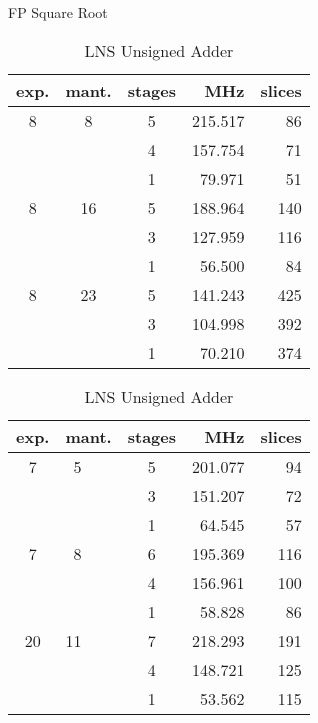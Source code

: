 \documentclass{llncs}
\begin{document}
\begin{table}
  \begin{center}
    \begin{minipage}{.45\linewidth}
      \caption{FP Square Root}
      \begin{center}
	\begin{tabular}{cccrr}
	  \hline
	  exp. & mant. & stages & MHz & slices\\
	  \hline
	  8   &  8 & 5 & 215.517 & 86 \\
	      &    & 4 & 157.754 & 71 \\
	      &    & 1 &  79.971 & 51 \\
	  \hline
	  8   & 16 & 5 & 188.964 & 140 \\
	      &    & 3 & 127.959 & 116 \\
	      &    & 1 &  56.500 &  84 \\
	  \hline
	  8   & 23 & 5 & 141.243 & 425 \\
	      &    & 3 & 104.998 & 392 \\
	      &    & 1 &  70.210 & 374 \\
	  \hline
	\end{tabular}
      \end{center}
      \label{tabpg_float_sqrt}
    \end{minipage}
    \hspace{2.0pc}
    \begin{minipage}{.45\linewidth}
      \caption{LNS Unsigned Adder}
      \begin{center}
	\begin{tabular}{clcrr}
	  \hline
	  exp. & mant. & stages & MHz & slices\\
	  \hline
	  7   &  ~5 & 5 & 201.077 & 94 \\
	      &           & 3 & 151.207 & 72 \\
	      &           & 1 &  64.545 & 57 \\
	  \hline
	  7   &  ~8 & 6 & 195.369 & 116 \\
	      &                & 4 & 156.961 & 100 \\
	      &                & 1 &  58.828 &  86 \\
	  \hline
	  20   & 11 & 7 & 218.293 & 191 \\
	       &                & 4 & 148.721 & 125 \\
	       &                & 1 &  53.562 & 115 \\
	  \hline
	\end{tabular}
      \end{center}
      \label{tabpg_log_unsigned_add}
    \end{minipage}
  \end{center}
\end{table}
\end{document}
